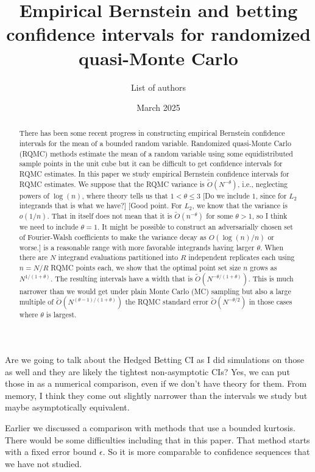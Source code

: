 \documentclass{article}
\title{Empirical Bernstein and betting confidence intervals for randomized quasi-Monte Carlo}
\date{March 2025}
\author{List of authors}
\newcommand{\art}[1]{\begingroup\color{blue}#1\endgroup}
\newcommand{\aadit}[1]{\begingroup\color{orange}#1\endgroup}
\newcommand{\fred}[1]{\begingroup\color{red}#1\endgroup}
\renewcommand{\le}{\leqslant}
\begin{document}
\maketitle
\begin{abstract}
There has been some recent progress in constructing empirical Bernstein
confidence intervals for the mean of a bounded random variable.
Randomized quasi-Monte Carlo (RQMC) methods estimate the mean of a random
variable using some equidistributed sample points in the unit cube
but it can be difficult to get confidence intervals for RQMC
estimates.  In this paper we study empirical Bernstein confidence
intervals for RQMC estimates.  We suppose that
the RQMC variance is $\tilde O(N^{-\theta})$\fred{, i.e., neglecting powers of $\log (n)$,} where
theory tells us that $1<\theta\le3$ \fred{[Do we include $1$, since for $L_2$ integrands that is what we have?]} 
\art{[Good point. For $L_2$, we know that the variance is $o(1/n)$. That in itself
does not mean that it is $\tilde O(n^{-\theta})$ for some $\theta>1$, so I think
we need to include $\theta=1$. It might be possible to construct an adversarially
chosen set of Fourier-Walsh coefficients to make the variance decay as $O(\log(n)/n)$ or worse.]}
is a reasonable
range with more favorable integrands having larger
$\theta$. When there are $N$ integrand evaluations
partitioned into $R$ independent replicates each using $n=N/R$
RQMC points each, we show that the optimal point set size $n$ grows
as $N^{1/(1+\theta)}$. The resulting intervals have
a width that is $\tilde O(N^{-\theta/(1+\theta)})$. 
This is  much narrower
than we would get under plain Monte Carlo (MC) sampling
but also a large multiple of \fred{$\tilde O(N^{(\theta - 1)/(1+\theta)})$ }the RQMC standard error $\tilde O(N^{-\theta/2})$ in those cases where $\theta$ is largest.
\end{abstract}

\aadit{Are we going to talk about the Hedged Betting CI as I did simulations on those as well and they are likely the tightest non-asymptotic CIs?}
\art{Yes, we can put those in as a numerical comparison, even if we don't have theory for them.  From memory, I think they come out slightly narrower
than the intervals we study but maybe asymptotically equivalent.}

\art{Earlier we discussed a comparison with methods that use a
bounded kurtosis. There would be some difficulties including that
in this paper.  That method starts with a fixed error bound $\epsilon$. So
it is more comparable to confidence sequences that we have not
studied.}
\end{document}
